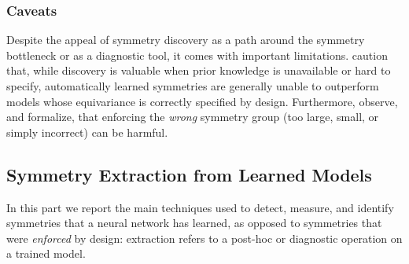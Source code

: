 \documentclass[mathematics,review,submit,moreauthors]{Definitions/mdpi}
\begin{document}
\subsubsection{Caveats}
Despite the appeal of symmetry discovery as a path around the symmetry bottleneck or as a diagnostic tool, it comes with important limitations.
\citet{rath2024air} caution that, while discovery is valuable when prior knowledge is unavailable or hard to specify, automatically learned symmetries are generally unable to outperform models whose equivariance is correctly specified by design.
Furthermore, \citet{yang2023p4icml} observe, and \citet{finzi2021anips} formalize, that enforcing the \emph{wrong} symmetry group (too large, small, or simply incorrect) can be harmful.


\subsection{Symmetry Extraction from Learned Models}
In this part we report the main techniques used to detect, measure, and identify symmetries that a neural network has learned, as opposed to symmetries that were \emph{enforced} by design: extraction refers to a post-hoc or diagnostic operation on a trained model.
\end{document}
